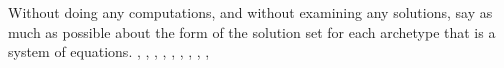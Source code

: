 Without doing any computations, and without examining any solutions, say as much as possible about the form of the solution set for each archetype that is a system of equations.\newline\newline
{},
,
,
,
,
,
,
,
,
